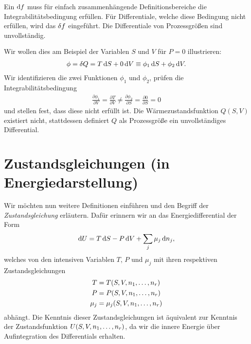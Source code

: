\begin{formal}
    Ein  $\mathop{}\!\mathrm{d} f$ muss für einfach zusammenhängende Definitionsbereiche die Integrabilitätsbedingung erfüllen. Für Differentiale, welche diese Bedingung nicht erfüllen, wird das  $\mathop{}\!\delta f$ eingeführt. Die Differentiale von Prozessgrößen sind unvollständig.
\end{formal}

Wir wollen dies am Beispiel der Variablen $S$ und $V$ für $P=0$ illustrieren:
\begin{align*}
    \phi = \mathop{}\!\delta Q = T\mathop{}\!\mathrm{d} S+0 \mathop{}\!\mathrm{d} V\equiv \phi_1\mathop{}\!\mathrm{d} S+\phi_2 \mathop{}\!\mathrm{d} V.
\end{align*}
Wir identifizieren die zwei Funktionen $\phi_1$ und $\phi_2$, prüfen die Integrabilitätsbedingung
\begin{align*}
    \frac{\partial \phi_1}{\partial V} = \frac{\partial T}{\partial V}\neq \frac{\partial \phi_2}{\partial S}=\frac{\partial0}{\partial S}=0
\end{align*}
und stellen fest, dass diese nicht erfüllt ist. Die Wärmezustandsfunktion $Q(S,V)$ existiert nicht, stattdessen definiert $Q$ als Prozessgröße ein unvollständiges Differential.

\section{Zustandsgleichungen (in Energiedarstellung)}
Wir möchten nun weitere Definitionen einführen und den Begriff der \emph{Zustandsgleichung} erläutern. Dafür erinnern wir an das Energiedifferential der Form
\begin{align*}
    \mathop{}\!\mathrm{d} U = T\mathop{}\!\mathrm{d} S -P\mathop{}\!\mathrm{d} V + \sum_j\mu_j\mathop{}\!\mathrm{d} n_j,
\end{align*}
welches von den intensiven Variablen $T$, $P$ und $\mu_j$ mit ihren respektiven Zustandsgleichungen
\begin{align*}
    T     & =T(S,V,n_1,\ldots,n_r)     \\
    P     & =P(S,V,n_1,\ldots,n_r)     \\
    \mu_j & =\mu_j(S,V,n_1,\ldots,n_r)
\end{align*}
abhängt. Die Kenntnis dieser Zustandsgleichungen ist äquivalent zur Kenntnis der Zustandsfunktion $U(S,V,n_1,\ldots,n_r)$, da wir die innere Energie über Aufintegration des Differentials erhalten.

